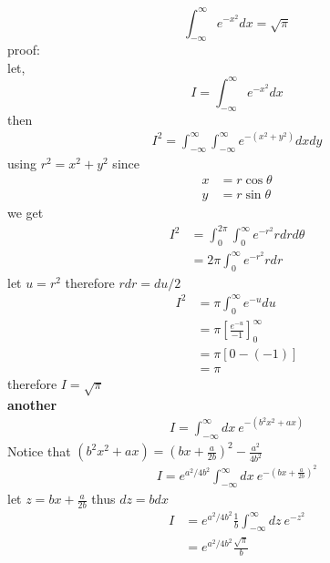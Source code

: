 \label{appendix1.Integrals}

\ifpdf
\graphicspath{{Appendix1/figs/}}
\else
\graphicspath{{Appendix1/figs/}}
\fi

\begin{equation}
	\int_{-\infty}^{\infty} e^{-x^2} dx = \sqrt{\pi}
\end{equation}
proof:\\
let,
\begin{equation}
	I = \int_{-\infty}^{\infty} e^{-x^2} dx 
\end{equation}
then
\begin{eqnarray}
	I^2 = \int_{-\infty}^{\infty}\int_{-\infty}^{\infty} e^{-(x^2+y^2)} dx dy
\end{eqnarray}
using $r^2 = x^2 + y^2$ since
\begin{eqnarray}
	x &= r \cos \theta \\
	y &= r \sin \theta
\end{eqnarray}
we get 
\begin{eqnarray}
	I^2 
	&= \int_{0}^{2 \pi}\int_{0}^{\infty} e^{-r^2} r dr d\theta \\
	&= 2 \pi \int_{0}^{\infty} e^{-r^2} r dr
\end{eqnarray}
let $u = r^2$ therefore $rdr = du/2$
\begin{eqnarray}
I^2 
&=  \pi \int_{0}^{\infty} e^{-u} du \\
&=  \pi \left[\frac{e^{-u}}{-1} \right]_{0}^{\infty} \\
&= \pi \left[0 - (-1)\right] \\
&= \pi
\end{eqnarray}
therefore $I=\sqrt{\pi}$\\
\textbf{another}\\
\begin{eqnarray}
I = \int_{-\infty}^{\infty} dx \  e^{-\left(b^2 x^2 + a x\right)}
\end{eqnarray}
Notice that $\left(b^2 x^2 + a x\right) = (b x + \frac{a}{2 b})^2 - \frac{a^2}{4b^2}$
\begin{eqnarray}
I = e^{a^2/4b^2}\int_{-\infty}^{\infty} dx\ e^{-(b x + \frac{a}{2 b})^2}
\end{eqnarray}
let $z = b x + \frac{a}{2 b}$ thus $dz = b dx$
\begin{eqnarray}
I 
&= e^{a^2/4b^2} \frac{1}{b} \int_{-\infty}^{\infty} dz\  e^{-z^2} \\
&= e^{a^2/4b^2} \frac{\sqrt{\pi}}{b}
\end{eqnarray}